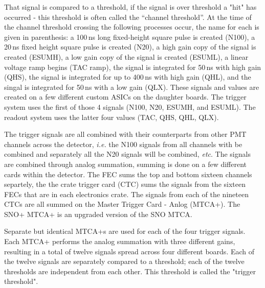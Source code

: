 That signal is compared to a threshold, if the signal is over threshold a "hit"
has occurred - this threshold is often called the ``channel threshold''.
At the time of the channel threshold crossing the following processes occur, the name for each is given
in parenthesis:
a 100\,ns long fixed-height square pulse is created (N100), a 20\,ns fixed height square pulse is created (N20),
a high gain copy of the signal is created (ESUMH), a low gain copy of the signal
is created (ESUML), a linear voltage ramp begins (TAC ramp), the signal is integrated for
50\,ns with high gain (QHS), the signal is integrated for up to 400\,ns with high gain (QHL),
and the singal is integrated for 50\,ns with a low gain (QLX).
These signals and values are created on a few different custom ASICs on the
daughter boards.
The trigger system uses the first of those 4 signals (N100, N20, ESUMH, and ESUML).
The readout system uses the latter four values (TAC, QHS, QHL, QLX).

The trigger signals are all combined with their counterparts from
other PMT channels across the detector, \textit{i.e.} the N100 signals
from all channels with be combined and separately all the
N20 signals will be combined, \textit{etc}.
The signals are combined through analog summation, summing is done on a few different
cards within the detector.
The FEC sums the top and bottom sixteen channels separtely, the the crate
trigger card (CTC) sums the signals from the sixteen
FECs that are in each electronics crate.
The signals from each of the nineteen CTCs are all summed on the
Master Trigger Card - Anlog (MTCA+). The SNO+ MTCA+ is an upgraded
version of the SNO MTCA.

Separate but identical MTCA+s are used for each of the four trigger signals.
Each MTCA+ performs the analog summation with three different gains,
resulting in a total of twelve signals spread across four different boards.
Each of the twelve signals are separately compared to a threshold;
each of the twelve thresholds are independent from each other.
This threshold is called the "trigger threshold".

